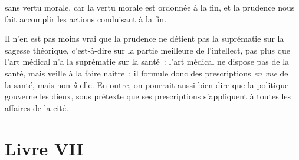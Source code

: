 \documentclass[french,twoside]{book} %
\begin{document}
sans vertu morale, car la vertu morale est ordonnée à la fin, et la prudence nous fait accomplir les actions conduisant à la fin.\par
Il n’en est pas moins vrai que la prudence ne détient pas la suprématie sur la sagesse théorique, c’est-à-dire sur la partie meilleure de l’intellect, pas plus que l’art médical n’a la suprématie sur la santé : l’art médical ne dispose pas de la santé, mais veille à la faire naître ; il formule donc des prescriptions {\itshape en vue} de \\
la santé, mais non {\itshape à} elle. En outre, on pourrait aussi bien dire que la politique gouverne les dieux, sous prétexte que ses prescriptions s’appliquent à toutes les affaires de la cité.
\section[{Livre VII}]{Livre VII}\renewcommand{\leftmark}{Livre VII}
\end{document}
